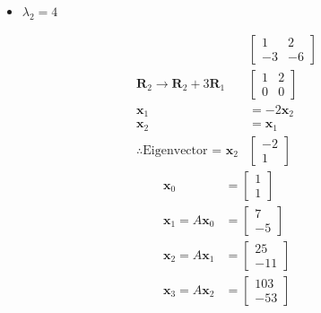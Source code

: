 \documentclass[12pt, a4paper]{scrartcl}
\begin{document}
\begin{enumerate}
\begin{enumerate}
                \pagebreak

                \begin{itemize}
                    \item[] $\lambda_2 = 4$
                \end{itemize}
                \begin{align*}
                    &\begin{bmatrix}
                        1&2\\-3&-6
                    \end{bmatrix}
                    \\ \textbf{R}_2 \to \textbf{R}_2 + 3\textbf{R}_1 &\begin{bmatrix}
                        1&2\\0&0
                    \end{bmatrix}
                    \\ \textbf{x}_1&=-2\textbf{x}_2
                    \\ \textbf{x}_2&=\textbf{x}_1
                    \\ \therefore \mbox{Eigenvector = }\textbf{x}_2&\begin{bmatrix}
                        -2\\1
                    \end{bmatrix}
                \end{align*}
                \begin{align*}
                    \textbf{x}_0 &= \begin{bmatrix}
                        1\\1
                    \end{bmatrix}
                    \\ \textbf{x}_1 = A\textbf{x}_0 &= \begin{bmatrix}
                        7\\-5
                    \end{bmatrix}
                    \\ \textbf{x}_2 = A\textbf{x}_1 &= \begin{bmatrix}
                        25\\-11
                    \end{bmatrix}
                    \\ \textbf{x}_3 = A\textbf{x}_2 &= \begin{bmatrix}
                        103\\-53
                    \end{bmatrix}

\end{align*}
\end{enumerate}
\end{enumerate}
\end{document}
